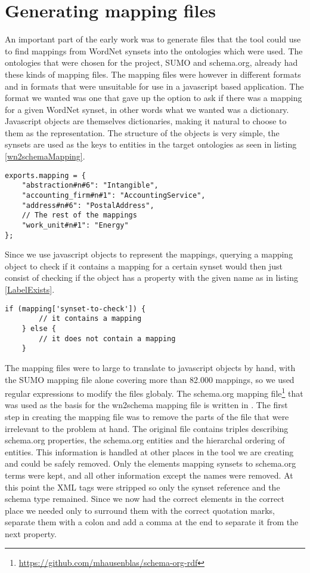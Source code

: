 \section{Generating mapping files}
An important part of the early work was to generate files that the tool could use to find mappings from WordNet synsets
into the ontologies which were used.
The ontologies that were chosen for the project, SUMO  and schema.org, already had these kinds of mapping files.
The mapping files were however in different formats and in formats that were unsuitable for use in a javascript based application.
The format we wanted was one that gave up the option to ask if there was a mapping for a given WordNet synset,
in other words what we wanted was a dictionary.
Javascript objects are themselves dictionaries, making it natural to choose to them as the representation.
The structure of the objects is very simple,
the synsets are used as the keys to entities in the target ontologies as seen in listing \ref{wn2schemaMapping}.

\begin{lstlisting}[label=wn2schemaMapping, caption={Excerpt from the \href{https://github.com/EivindEE/Madame/blob/master/mappings/wn2schema.js}{wn2schema.js} mapping file}]
exports.mapping = {
	"abstraction#n#6": "Intangible",
	"accounting_firm#n#1": "AccountingService",
	"address#n#6": "PostalAddress",
	// The rest of the mappings
	"work_unit#n#1": "Energy"
};
\end{lstlisting}

Since we use javascript objects to represent the mappings,
querying a mapping object to check if it contains a mapping for a certain synset would then just consist of checking if
the object has a property with the given name as in listing \ref{LabelExists}.
\begin{lstlisting}[label=LabelExists,caption=Testing if a mapping exists]
	if (mapping['synset-to-check']) {
		// it contains a mapping
	} else {
		// it does not contain a mapping
	}
\end{lstlisting}

The mapping files were to large to translate to javascript objects by hand, with the SUMO mapping file alone
covering more than 82.000 mappings, so we used regular expressions to modify the files globaly.
The schema.org mapping file\footnote{\url{https://github.com/mhausenblas/schema-org-rdf}}
that was used as the basis for the wn2schema mapping file is written in .
The first step in creating the mapping file was to remove the parts of the file that were irrelevant to the problem at hand.
The original file contains triples describing schema.org properties,
the schema.org entities and the hierarchal ordering of entities.
This information is handled at other places in the tool we are creating and could be safely removed.
Only the elements mapping synsets to schema.org terms were kept, and all other information except the names were removed.
At this point the XML tags were stripped so only the synset reference and the schema type remained.
Since we now had the correct elements in the correct place we needed only to surround them with the correct quotation
marks, separate them with a colon and add a comma at the end to separate it from the next property.

